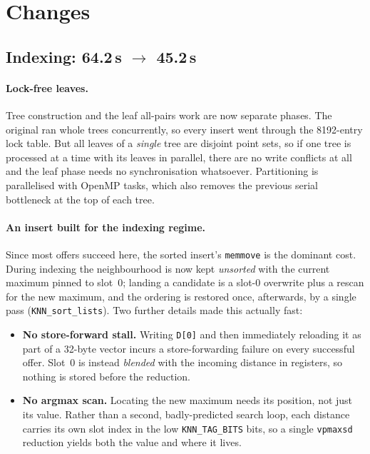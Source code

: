 \documentclass[11pt,a4paper]{article}
\newcommand{\code}[1]{\texttt{\small #1}}
\begin{document}
\section{Changes}

\subsection{Indexing: 64.2\,s $\rightarrow$ 45.2\,s}

\paragraph{Lock-free leaves.} Tree construction and the leaf all-pairs work are
now separate phases. The original ran whole trees concurrently, so every insert
went through the 8192-entry lock table. But all leaves of a \emph{single} tree
are disjoint point sets, so if one tree is processed at a time with its leaves
in parallel, there are no write conflicts at all and the leaf phase needs no
synchronisation whatsoever. Partitioning is parallelised with OpenMP tasks,
which also removes the previous serial bottleneck at the top of each tree.

\paragraph{An insert built for the indexing regime.} Since most offers succeed
here, the sorted insert's \code{memmove} is the dominant cost. During indexing
the neighbourhood is now kept \emph{unsorted} with the current maximum pinned to
slot~0; landing a candidate is a slot-0 overwrite plus a rescan for the new
maximum, and the ordering is restored once, afterwards, by a single pass
(\code{KNN\_sort\_lists}). Two further details made this actually fast:

\begin{itemize}
\item \textbf{No store-forward stall.} Writing \code{D[0]} and then immediately
reloading it as part of a 32-byte vector incurs a store-forwarding failure on
every successful offer. Slot~0 is instead \emph{blended} with the incoming
distance in registers, so nothing is stored before the reduction.
\item \textbf{No argmax scan.} Locating the new maximum needs its position, not
just its value. Rather than a second, badly-predicted search loop, each distance
carries its own slot index in the low \code{KNN\_TAG\_BITS} bits, so a single
\code{vpmaxsd} reduction yields both the value and where it lives.
\end{itemize}
\end{document}
